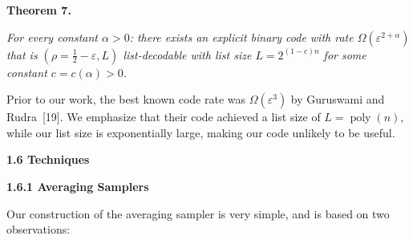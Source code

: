 \documentclass[10pt,a4paper]{article}
\begin{document}


\par\medskip\noindent\textbf{
\textbf{Theorem 7}\textbf{.}
}\par



\emph{For every constant $\alpha>0$: there exists an explicit binary code with rate $\Omega(\varepsilon^{2+\alpha})$ that is $(\rho=\frac{1}{2}-\varepsilon,L)$ list-decodable with list size $L=2^{(1-c)n}$ for some constant $c=c(\alpha)>0$.}\par






Prior to our work, the best known code rate was $\Omega(\varepsilon^{3})$ by Guruswami and Rudra [19]. We emphasize that their code achieved a list size of $L=\operatorname*{poly}(n)$, while our list size is exponentially large, making our code unlikely to be useful.\par





\par\medskip\noindent\textbf{
1.6 Techniques}\par




\par\medskip\noindent\textbf{
1.6.1 Averaging Samplers}\par




Our construction of the averaging sampler is very simple, and is based on two observations:\par
\end{document}
